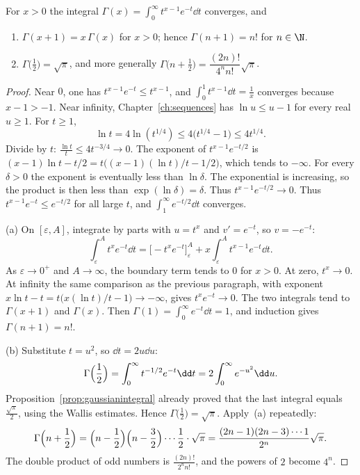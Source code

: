 \begin{proposition}\label{prop:gammafn}
For $x>0$ the integral $\Gamma(x)=\displaystyle\int_0^\infty t^{x-1}e^{-t}\dd t$ converges, and
\begin{enumerate}[label=(\alph*)]
\item $\Gamma(x+1)=x\,\Gamma(x)$ for $x>0$; hence $\Gamma(n+1)=n!$ for $n\in\N$.
\item $\Gamma\bigl(\frac12\bigr)=\sqrt\pi$, and more generally $\Gamma\bigl(n+\frac12\bigr)=\dfrac{(2n)!}{4^n n!}\sqrt\pi$.
\end{enumerate}
\end{proposition}
\begin{proof}
Near $0$, one has $t^{x-1}e^{-t}\le t^{x-1}$, and $\int_0^1 t^{x-1}\dd t=\frac1x$ converges because $x-1>-1$. Near infinity, Chapter~\ref{ch:sequences} has $\ln u\le u-1$ for every real $u\ge1$. For $t\ge1$,
\[
\ln t=4\ln(t^{1/4})\le4\bigl(t^{1/4}-1\bigr)\le4t^{1/4}.
\]
Divide by $t$: $\frac{\ln t}t\le4t^{-3/4}\to0$. The exponent of $t^{x-1}e^{-t/2}$ is $(x-1)\ln t-t/2=t\bigl((x-1)(\ln t)/t-1/2\bigr)$, which tends to $-\infty$. For every $\delta>0$ the exponent is eventually less than $\ln\delta$. The exponential is increasing, so the product is then less than $\exp(\ln\delta)=\delta$. Thus $t^{x-1}e^{-t/2}\to0$. Thus $t^{x-1}e^{-t}\le e^{-t/2}$ for all large $t$, and $\int_1^\infty e^{-t/2}\dd t$ converges.

(a) On $[\varepsilon,A]$, integrate by parts with $u=t^x$ and $v'=e^{-t}$, so $v=-e^{-t}$:
\[
\int_\varepsilon^A t^x e^{-t}\dd t=\bigl[-t^x e^{-t}\bigr]_\varepsilon^A+x\int_\varepsilon^A t^{x-1}e^{-t}\dd t.
\]
As $\varepsilon\to0^+$ and $A\to\infty$, the boundary term tends to $0$ for $x>0$. At zero, $t^x\to0$. At infinity the same comparison as the previous paragraph, with exponent $x\ln t-t=t\bigl(x(\ln t)/t-1\bigr)\to-\infty$, gives $t^xe^{-t}\to0$. The two integrals tend to $\Gamma(x+1)$ and $\Gamma(x)$. Then $\Gamma(1)=\int_0^\infty e^{-t}\dd t=1$, and induction gives $\Gamma(n+1)=n!$.

(b) Substitute $t=u^2$, so $\dd t=2u\dd u$:
\[
\Gamma\Bigl(\frac12\Bigr)=\int_0^\infty t^{-1/2}e^{-t}\dd t=2\int_0^\infty e^{-u^2}\dd u.
\]
Proposition~\ref{prop:gaussianintegral} already proved that the last integral equals $\frac{\sqrt\pi}2$, using the Wallis estimates. Hence $\Gamma\bigl(\frac12\bigr)=\sqrt\pi$. Apply~(a) repeatedly:
\[
\Gamma\Bigl(n+\frac12\Bigr)=\Bigl(n-\frac12\Bigr)\Bigl(n-\frac32\Bigr)\cdots\frac12\cdot\sqrt\pi=\frac{(2n-1)(2n-3)\cdots1}{2^n}\sqrt\pi.
\]
The double product of odd numbers is $\frac{(2n)!}{2^n n!}$, and the powers of $2$ become $4^n$.
\end{proof}

